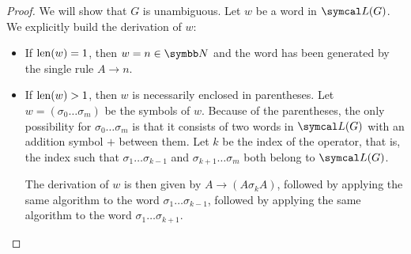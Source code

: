 \begin{proof}
  We will show that \( G \) is unambiguous. Let \( w \) be a word in \( \Cal{L}(G) \). We explicitly build the derivation of \( w \):
  \begin{itemize}
    \item If \( \operatorname{len}(w) = 1 \), then \( w = n \in \BB{N} \) and the word has been generated by the single rule \( A \to n \).
    \item If \( \operatorname{len}(w) > 1 \), then \( w \) is necessarily enclosed in parentheses. Let \( w = ( \sigma_0 \ldots \sigma_m ) \) be the symbols of \( w \). Because of the parentheses, the only possibility for \( \sigma_0 \ldots \sigma_m \) is that it consists of two words in \( \Cal{L}(G) \) with an addition symbol \( + \) between them. Let \( k \) be the index of the operator, that is, the index such that \( \sigma_1 \ldots \sigma_{k-1} \) and \( \sigma_{k+1} \ldots \sigma_m \) both belong to \( \Cal{L}(G) \).

    The derivation of \( w \) is then given by \( A \to (A \sigma_k A) \), followed by applying the same algorithm to the word \( \sigma_1 \ldots \sigma_{k-1} \), followed by applying the same algorithm to the word \( \sigma_1 \ldots \sigma_{k+1} \).
  \end{itemize}
\end{proof}
